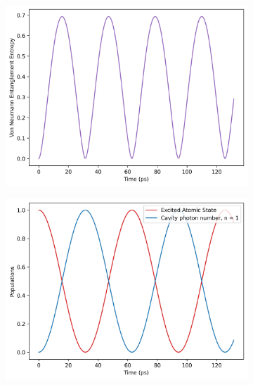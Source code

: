 \documentclass[11pt]{article}
\begin{document}
\begin{figure}[h]
    \centering
    \begin{subfigure}{0.45\textwidth}
        \centering
        \includegraphics[width=\linewidth]{Research Project/Code/results/JCM/CQS_vne.png}
        \caption{}
        \label{fig:JCM_cqs_vne_e0}
    \end{subfigure}
    \begin{subfigure}{0.45\textwidth}
        \centering
        \includegraphics[width=\linewidth]{Research Project/Code/results/JCM/CQS_expt.png}
        \caption{}
        \label{fig:JCM_cqs_xpt_e0}
    \end{subfigure}

        \vspace{0.5cm}
    

\end{figure}
\end{document}
